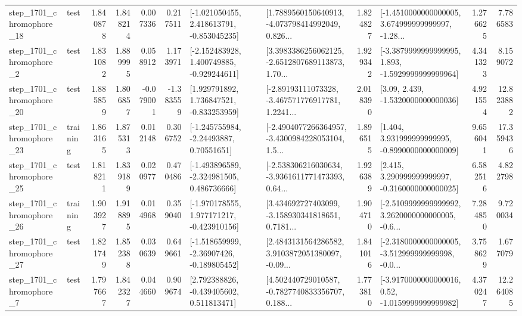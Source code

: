 \begin{tabular}{llrrrrllrlrr}
 step\_1701\_chromophore\_18 &      test &      1.840878 &    1.848214 &      0.007336 &  0.217511 &   [-1.021050455, 2.418613791, -0.853045235] &  [1.7889560150640913, -4.073798414992049, 0.826... &       1.824827 &  [-1.4510000000000005, 3.674999999999997, -1.28... &            1.276625 &          7.786583 \\
  step\_1701\_chromophore\_2 &      test &      1.831082 &    1.889995 &      0.058912 &  1.173971 &   [-2.152483928, 1.400749885, -0.929244611] &  [3.3983386256062125, -2.6512807689113873, 1.70... &       1.929342 &  [-3.3879999999999995, 1.893, -1.5929999999999964] &            4.341323 &          8.159072 \\
 step\_1701\_chromophore\_20 &      test &      1.885859 &    1.806857 &     -0.079001 & -1.383559 &    [1.929791892, 1.736847521, -0.833253959] &  [-2.89193111073328, -3.467571776917781, 1.2241... &       2.018390 &                 [3.09, 2.439, -1.5320000000000036] &            4.921554 &         12.823882 \\
 step\_1701\_chromophore\_23 &  training &      1.863165 &    1.875313 &      0.012148 &  0.306752 &     [-1.245755984, -2.24493887, 0.70551651] &  [-2.4904077266364957, -3.4300984228053104, 1.5... &       1.896515 &    [1.404, 3.931999999999995, -0.8990000000000009] &            9.656041 &         17.359436 \\
 step\_1701\_chromophore\_25 &      test &      1.818211 &    1.839189 &      0.020977 &  0.470486 &   [-1.493896589, -2.324981505, 0.486736666] &  [-2.538306216030634, -3.9361611771473393, 0.64... &       1.926389 &    [2.415, 3.290999999999997, -0.3160000000000025] &            6.582516 &          4.822798 \\
 step\_1701\_chromophore\_26 &  training &      1.903927 &    1.918895 &      0.014968 &  0.359040 &   [-1.970178555, 1.977171217, -0.423910156] &  [3.434692727403099, -3.158930341818651, 0.7181... &       1.904710 &  [-2.5109999999999992, 3.2620000000000005, -0.6... &            7.284850 &          9.720034 \\
 step\_1701\_chromophore\_27 &      test &      1.821749 &    1.852388 &      0.030639 &  0.649661 &   [-1.518659999, -2.36907426, -0.189805452] &  [2.4843131564286582, 3.9103872051380097, -0.09... &       1.841016 &  [-2.3180000000000005, -3.512999999999998, -0.0... &            3.758629 &          1.677079 \\
  step\_1701\_chromophore\_7 &      test &      1.797667 &    1.842327 &      0.044660 &  0.909674 &    [2.792388826, -0.439405602, 0.511813471] &  [4.502440729010587, -0.7827740833356707, 0.188... &       1.773810 &   [-3.9170000000000016, 0.52, -1.0159999999999982] &            4.370247 &         12.264085 \\

\end{tabular}
